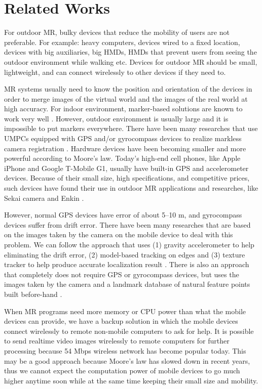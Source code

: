 
\section{Related Works}

For outdoor MR, bulky devices that reduce the mobility of users are not preferable. For example: heavy computers, devices wired to a fixed location, devices with big auxiliaries, big HMDs, HMDs that prevent users from seeing the outdoor environment while walking etc. Devices for outdoor MR should be small, lightweight, and can connect wirelessly to other devices if they need to.

MR systems usually need to know the position and orientation of the devices in order to merge images of the virtual world and the images of the real world at high accuracy. For indoor environment, marker-based solutions are known to work very well \cite{Reference20}. However, outdoor environment is usually large and it is impossible to put markers everywhere. There have been many researches that use UMPCs equipped with GPS and/or gyrocompass devices to realize markless camera registration \cite{Reference2} \cite{Reference4} \cite{Reference13}. Hardware devices have been becoming smaller and more powerful according to Moore's law. Today's high-end cell phones, like Apple iPhone and Google T-Mobile G1, usually have built-in GPS and accelerometer devices. Because of their small size, high specifications, and competitive prices, such devices have found their use in outdoor MR applications and researches, like Sekai camera \cite{Reference18} and Enkin \cite{Reference19}.

However, normal GPS devices have error of about 5--10 m, and gyrocompass devices suffer from drift error. There have been many researches that are based on the images taken by the camera on the mobile device to deal with this problem. We can follow the approach that uses (1) gravity accelerometer to help eliminating the drift error, (2) model-based tracking on edges and (3) texture tracker to help produce accurate localization result \cite{Reference13}. There is also an approach that completely does not require GPS or gyrocompass devices, but uses the images taken by the camera and a landmark database of natural feature points built before-hand \cite{Reference21}.

When MR programs need more memory or CPU power than what the mobile devices can provide, we have a backup solution in which the mobile devices connect wirelessly to remote non-mobile computers to ask for help. It is possible to send realtime video images wirelessly to remote computers for further processing because 54 Mbps wireless network has become popular today. This may be a good approach because Moore's law has slowed down in recent years, thus we cannot expect the computation power of mobile devices to go much higher anytime soon while at the same time keeping their small size and mobility.

